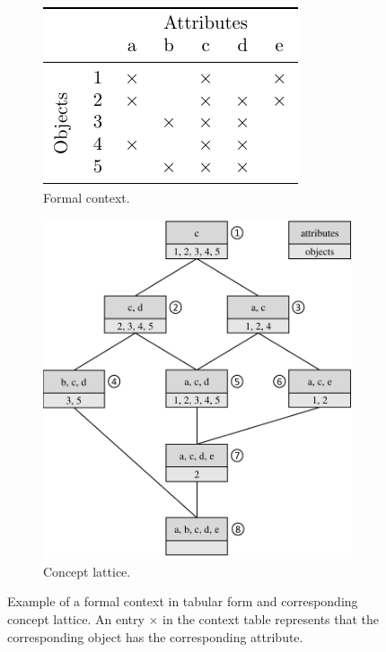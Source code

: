 \begin{figure}[htb!]
	\centering
	\begin{subfigure}[b]{0.39\textwidth}
		\centering
		\includegraphics[width=\textwidth,keepaspectratio]{images/background/FCA-conext-ex.pdf}
		\caption{Formal context.}
		\label{fig:example-FC}
	\end{subfigure}
	\hfill
	\begin{subfigure}[b]{0.6\textwidth}
		\centering
		\includegraphics[width=\textwidth,keepaspectratio]{images/background/FCA-lattice-ex.pdf}
		\caption{Concept lattice.}
		\label{fig:example-CL}
	\end{subfigure}
	
	\caption[Example of a formal context in tabular form and corresponding concept lattice]{Example of a formal context in tabular form and corresponding concept lattice. An entry $\times$ in the context table represents that the corresponding object has the corresponding attribute.}
	\label{fig:example-FC-CL}
\end{figure}

